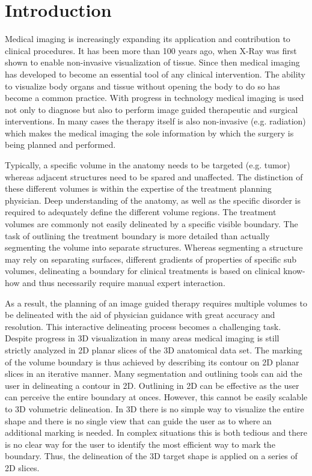 
\section{Introduction}
\label{sec:intro}

Medical imaging is increasingly expanding its application and contribution to clinical procedures. It has been more than 100 years ago, when X-Ray was first shown to enable non-invasive visualization of tissue. Since then medical imaging has developed to become an essential tool of any clinical intervention. The ability to visualize body organs and tissue without opening the body to do so has become a common practice. With progress in technology medical imaging is used not only to diagnose but also to perform image guided therapeutic and surgical interventions. In many cases the therapy itself is also non-invasive (e.g. radiation) which makes the medical imaging the sole information by which the surgery is being planned and performed.

Typically, a specific volume in the anatomy needs to be targeted (e.g. tumor) whereas adjacent structures need to be spared and unaffected. The distinction of these different volumes is within the expertise of the treatment planning physician. Deep understanding of the anatomy, as well as the specific disorder is required to adequately define the different volume regions. The treatment volumes are commonly not easily delineated by a specific visible boundary. The task of outlining the treatment boundary is more detailed than actually segmenting the volume into separate structures. Whereas segmenting a structure may rely on separating surfaces, different gradients of properties of specific sub volumes, delineating a boundary for clinical treatments is based on clinical know-how and thus necessarily require manual expert interaction.

As a result, the planning of an image guided therapy requires multiple volumes to be delineated with the aid of physician guidance with great accuracy and resolution. This interactive delineating process becomes a challenging task. Despite progress in 3D visualization in many areas medical imaging is still strictly analyzed in 2D planar slices of the 3D anatomical data set. The marking of the volume boundary is thus achieved by describing its contour on 2D planar slices in an iterative manner. Many segmentation and outlining tools can aid the user in delineating a contour in 2D. Outlining in 2D can be effective as the user can perceive the entire boundary at onces. However, this cannot be easily scalable to 3D volumetric delineation. In 3D there is no simple way to visualize the entire shape and there is no single view that can guide the user as to where an additional marking is needed. In complex situations this is both tedious and there is no clear way for the user to identify the most efficient way to mark the boundary. Thus, the delineation of the 3D target shape is applied on a series of 2D slices. 

